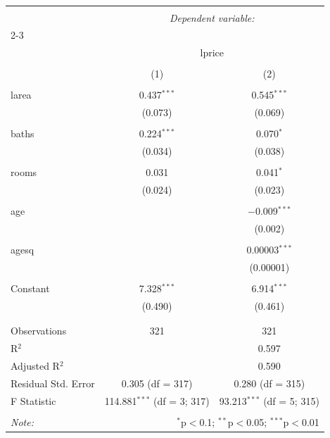 \documentclass[10pt,a4paper]{article}
\begin{document}
\begin{enumerate}
\begin{table}[!htbp] \centering 
  \caption{} 
  \label{} 
\begin{tabular}{@{\extracolsep{5pt}}lcc} 
\\[-1.8ex]\hline 
\hline \\[-1.8ex] 
 & \multicolumn{2}{c}{\textit{Dependent variable:}} \\ 
\cline{2-3} 
\\[-1.8ex] & \multicolumn{2}{c}{lprice} \\ 
\\[-1.8ex] & (1) & (2)\\ 
\hline \\[-1.8ex] 
 larea & 0.437$^{***}$ & 0.545$^{***}$ \\ 
  & (0.073) & (0.069) \\ 
  & & \\ 
 baths & 0.224$^{***}$ & 0.070$^{*}$ \\ 
  & (0.034) & (0.038) \\ 
  & & \\ 
 rooms & 0.031 & 0.041$^{*}$ \\ 
  & (0.024) & (0.023) \\ 
  & & \\ 
 age &  & $-$0.009$^{***}$ \\ 
  &  & (0.002) \\ 
  & & \\ 
 agesq &  & 0.00003$^{***}$ \\ 
  &  & (0.00001) \\ 
  & & \\ 
 Constant & 7.328$^{***}$ & 6.914$^{***}$ \\ 
  & (0.490) & (0.461) \\ 
  & & \\ 
\hline \\[-1.8ex] 
Observations & 321 & 321 \\ 
R$^{2}$ &  & 0.597 \\ 
Adjusted R$^{2}$ &  & 0.590 \\ 
Residual Std. Error & 0.305 (df = 317) & 0.280 (df = 315) \\ 
F Statistic & 114.881$^{***}$ (df = 3; 317) & 93.213$^{***}$ (df = 5; 315) \\ 
\hline 
\hline \\[-1.8ex] 
\textit{Note:}  & \multicolumn{2}{r}{$^{*}$p$<$0.1; $^{**}$p$<$0.05; $^{***}$p$<$0.01} \\ 
\end{tabular} 
\end{table} 


\end{enumerate}
\end{document}

